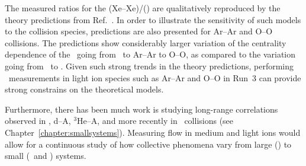 The measured ratios for the \vn(Xe--Xe)/\vn(\pbpb) are qualitatively reproduced 
  by the theory predictions from Ref.~\cite{Giacalone:2017dud}.
In order to illustrate the sensitivity of such models to the collision species, 
  predictions are also presented for Ar--Ar and O--O collisions. 
The predictions show considerably larger variation of the centrality dependence
  of the \vn\ going from \xexe\ to Ar--Ar to O--O, as compared to
  the variation going from \pbpb\ to \xexe.
Given such strong trends in the theory predictions, performing \vn\ measurements 
  in light ion species such as Ar--Ar and O--O in Run~3 can provide strong 
  constrains on the theoretical models.

Furthermore, there has been much work is studying long-range correlations
  observed in \pA, d--A, $^{3}\mathrm{He}$--A, and more recently in 
  \pp\ collisions (see Chapter~\ref{chapter:smallsystems}).
Measuring flow in medium and light ions would allow for a continuous study 
  of how collective phenomena vary from large (\pbpb) to small 
  (\pA\ and \pp) systems.


